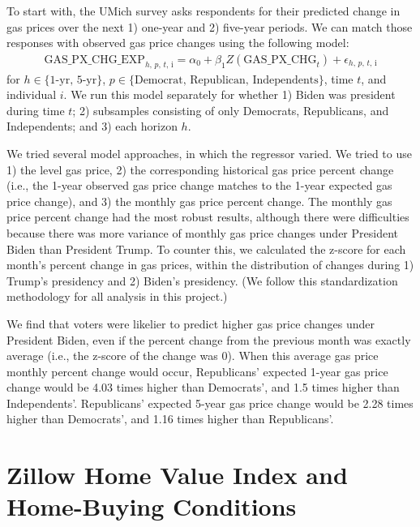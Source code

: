 \documentclass{article}
\begin{document}
To start with, the UMich survey asks respondents for their predicted change in gas prices over the next 1) one-year and 2) five-year periods. We can match those responses with observed gas price changes using the following model: 
\begin{gather}
	 \text{GAS\_PX\_CHG\_EXP}_{h\text{, }p\text{, }t\text{, i}} = \alpha_0 + \beta_1 Z(\text{GAS\_PX\_CHG}_t) + \epsilon_{h\text{, }p\text{, }t\text{, i}}
\end{gather}
for $h \in \{\text{1-yr, 5-yr}\}$, $p \in \{\text{Democrat, Republican, Independents}\}$, time $t$, and individual $i$. We run this model separately for whether 1) Biden was president during time $t$; 2) subsamples consisting of only Democrats, Republicans, and Independents; and 3) each horizon $h$. 

We tried several model approaches, in which the regressor varied. We tried to use 1) the level gas price, 2) the corresponding historical gas price percent change (i.e., the 1-year observed gas price change matches to the 1-year expected gas price change), and 3) the monthly gas price percent change. The monthly gas price percent change had the most robust results, although there were difficulties because there was more variance of monthly gas price changes under President Biden than President Trump. To counter this, we calculated the z-score for each month's percent change in gas prices, within the distribution of changes during 1) Trump's presidency and 2) Biden's presidency. (We follow this standardization methodology for all analysis in this project.)

We find that voters were likelier to predict higher gas price changes under President Biden, even if the percent change from the previous month was exactly average (i.e., the z-score of the change was 0). When this average gas price monthly percent change would occur, Republicans' expected 1-year gas price change would be 4.03 times higher than Democrats', and 1.5 times higher than Independents'. Republicans' expected 5-year gas price change would be 2.28 times higher than Democrats', and 1.16 times higher than Republicans'. 

\section{Zillow Home Value Index and Home-Buying Conditions} 
\end{document}

